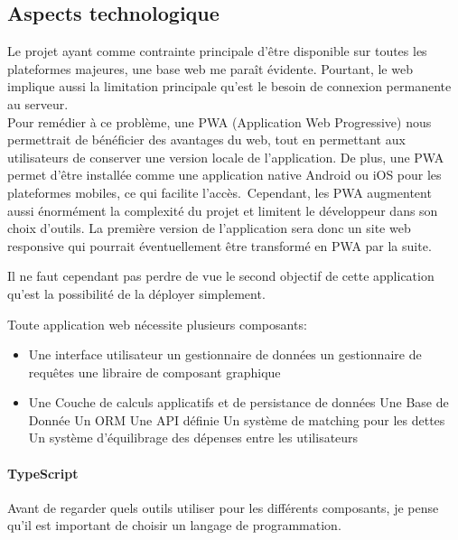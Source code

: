 
\subsection{Aspects technologique}\label{subsec:aspects-technologique}
Le projet ayant comme contrainte principale d'être disponible sur toutes les plateformes majeures, une base web me paraît évidente.
Pourtant, le web implique aussi la limitation principale qu'est le besoin de connexion permanente au serveur.\\
Pour remédier à ce problème, une PWA (Application Web Progressive) nous permettrait de bénéficier des avantages du web,
tout en permettant aux utilisateurs de conserver une version locale de l'application.
De plus, une PWA permet d'être installée comme une application native Android ou iOS pour les plateformes mobiles, ce qui facilite l'accès.\
Cependant, les PWA augmentent aussi énormément la complexité du projet et limitent le développeur dans son choix d'outils.
La première version de l'application sera donc un site web responsive qui pourrait éventuellement être transformé en PWA par la suite.

Il ne faut cependant pas perdre de vue le second objectif de cette application qu'est la possibilité de la déployer simplement.

Toute application web nécessite plusieurs composants:
\begin{itemize}
    \item Une interface utilisateur
    \subitem un gestionnaire de données
    \subitem un gestionnaire de requêtes
    \subitem une libraire de composant graphique
    \item Une Couche de calculs applicatifs et de persistance de données
    \subitem Une Base de Donnée
    \subitem Un ORM
    \subitem Une API définie
    \subitem Un système de matching pour les dettes
    \subitem Un système d'équilibrage des dépenses entre les utilisateurs
\end{itemize}

\paragraph{TypeScript}
Avant de regarder quels outils utiliser pour les différents composants, je pense qu'il est important de choisir un langage de programmation.\\

